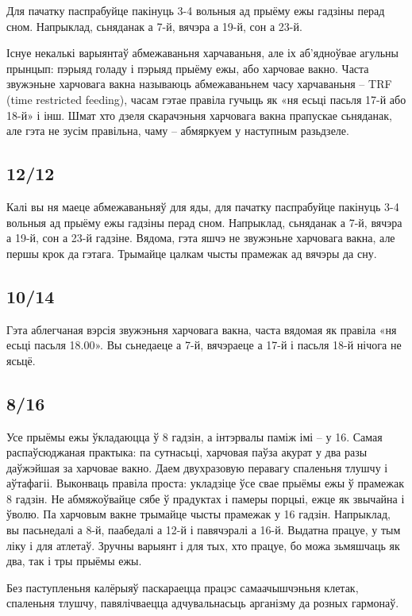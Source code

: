 Для пачатку паспрабуйце пакінуць 3-4 вольныя ад прыёму ежы гадзіны перад сном. Напрыклад, сьняданак а 7-й, вячэра а 19-й, сон а 23-й.

Існуе некалькі варыянтаў абмежаваньня харчаваньня, але іх аб'ядноўвае агульны прынцып: пэрыяд голаду і пэрыяд прыёму ежы, або харчовае вакно. Часта звужэньне харчовага вакна называюць абмежаваньнем часу харчаваньня – TRF (time restricted feeding), часам гэтае правіла гучыць як «ня есьці пасьля 17-й або 18-й» і інш. Шмат хто дзеля скарачэньня харчовага вакна прапускае сьняданак, але гэта не зусім правільна, чаму – абмяркуем у наступным разьдзеле.

\subsection{12/12}
Калі вы ня маеце абмежаваньняў для яды, для пачатку паспрабуйце пакінуць 3-4 вольныя ад прыёму ежы гадзіны перад сном. Напрыклад, сьняданак а 7-й, вячэра а 19-й, сон а 23-й гадзіне. Вядома, гэта яшчэ не звужэньне харчовага вакна, але першы крок да гэтага. Трымайце цалкам чысты прамежак ад вячэры да сну.

\subsection{10/14}
Гэта аблегчаная вэрсія звужэньня харчовага вакна, часта вядомая як правіла «ня есьці пасьля 18.00». Вы сьнедаеце а 7-й, вячэраеце а 17-й і пасьля 18-й нічога не ясьцё.

\subsection{8/16}
Усе прыёмы ежы ўкладаюцца ў 8 гадзін, а інтэрвалы паміж імі – у 16. Самая распаўсюджаная практыка: па сутнасьці, харчовая паўза акурат у два разы даўжэйшая за харчовае вакно. Даем двухразовую перавагу спаленьня тлушчу і аўтафагіі. Выконваць правіла проста: укладзіце ўсе свае прыёмы ежы ў прамежак 8 гадзін. Не абмяжоўвайце сябе ў прадуктах і памеры порцыі, ежце як звычайна і ўволю. Па харчовым вакне трымайце чысты прамежак у 16 гадзін. Напрыклад, вы пасьнедалі а 8-й, паабедалі а 12-й і павячэралі а 16-й. Выдатна працуе, у тым ліку і для атлетаў. Зручны варыянт і для тых, хто працуе, бо можа зьмяшчаць як два, так і тры прыёмы ежы.

Без паступленьня калёрыяў паскараецца працэс самаачышчэньня клетак, спаленьня тлушчу, павялічваецца адчувальнасьць арганізму да розных гармонаў.

